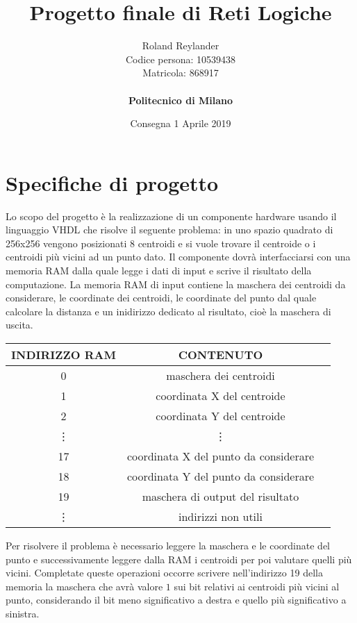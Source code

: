 \documentclass{article}
\title{\textbf{Progetto finale di Reti Logiche}}
\author{Roland Reylander \\
	\hspace{3em} Codice persona: 10539438 \\
	Matricola: 868917 \\
	\vspace*{0.5in} \\
	\textbf{Politecnico di Milano}}
\date{Consegna 1 Aprile 2019}
\begin{document}
	
	\maketitle
	\leavevmode
	
	\pagebreak
	\tableofcontents
	
	
	\pagebreak
	
	\section{Specifiche di progetto}
	Lo scopo del progetto \`e la realizzazione di un componente hardware usando il linguaggio VHDL che risolve il seguente problema: in uno spazio quadrato di 256x256 vengono posizionati 8 centroidi e si vuole trovare il centroide o i centroidi pi\`{u} vicini ad un punto dato.
	\newline
	Il componente dovr\`{a} interfacciarsi con una memoria RAM dalla quale legge i dati di input e scrive il risultato della computazione. La memoria RAM di input contiene la maschera dei centroidi da considerare, le coordinate dei centroidi, le coordinate del punto dal quale calcolare la distanza e un inidirizzo dedicato al risultato, cio\`{e} la maschera di uscita.
	\newline
	
	\renewcommand{\arraystretch}{1.5}
	\begin{center}
		
		\begin{tabular}{ |c|c|c| }
			\hline
			INDIRIZZO RAM & CONTENUTO \\ 
			\hline
			0 & maschera dei centroidi \\
			\hline
			1 & coordinata X del centroide \\
			\hline
			2 & coordinata Y del centroide \\
			\hline
			\vdots & \vdots \\
			\hline
			17 & coordinata X del punto da considerare \\
			\hline
			18 & coordinata Y del punto da considerare \\
			\hline
			19 & maschera di output del risultato \\
			\hline
			\vdots & indirizzi non utili \\
			\hline
		\end{tabular}
	\end{center}
	\leavevmode\newline
	Per risolvere il problema \`{e} necessario leggere la maschera e le coordinate del punto e successivamente leggere dalla RAM i centroidi per poi valutare quelli pi\`{u} vicini. Completate queste operazioni occorre scrivere nell'indirizzo 19 della memoria la maschera che avr\`{a} valore $1$ sui bit relativi ai centroidi pi\`{u} vicini al punto, considerando il bit meno significativo a destra e quello pi\`{u} significativo a sinistra.
	
\end{document}
